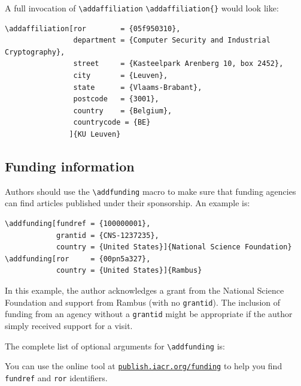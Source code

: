 \documentclass{article}
\newcommand{\cmd}[2][]{%
  \def\FirstArg{#1}%
  \ifx\FirstArg\empty%
    \texttt{\textbackslash{}#2}%
  \else%
    \texttt{\textbackslash{}#2\{#1\}}%
  \fi
}
\begin{document}
A full invocation of \cmd{addaffiliation} would look like:
\begin{Verbatim}[samepage=true]
\addaffiliation[ror        = {05f950310},
                department = {Computer Security and Industrial Cryptography},
                street     = {Kasteelpark Arenberg 10, box 2452},
                city       = {Leuven},
                state      = {Vlaams-Brabant},
                postcode   = {3001},
                country    = {Belgium},
                countrycode = {BE}
               ]{KU Leuven}
\end{Verbatim}
\subsection{Funding information}
Authors should use the \texttt{\textbackslash addfunding} macro to
make sure that funding agencies can find articles published under their
sponsorship. An example is:
\begin{verbatim}
\addfunding[fundref = {100000001},
            grantid = {CNS-1237235},
            country = {United States}]{National Science Foundation}
\addfunding[ror     = {00pn5a327},
            country = {United States}]{Rambus}
\end{verbatim}

\noindent In this example, the author acknowledges a grant from the
National Science Foundation and support from Rambus (with no
\texttt{grantid}). The inclusion of funding from an agency without a
\texttt{grantid} might be appropriate if the author simply received
support for a visit.

The complete list of optional arguments for \texttt{\textbackslash addfunding} is:

\begin{center}
\begin{arglist}
\end{arglist}
\end{center}

\noindent You can use the online tool at 
\href{https://publish.iacr.org/funding}{\texttt{publish.iacr.org/funding}} to
help you find \texttt{fundref} and \texttt{ror} identifiers.
\end{document}
